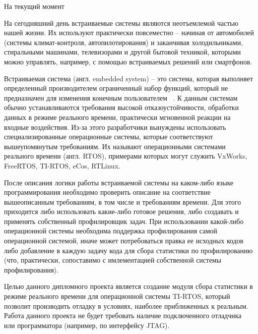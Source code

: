\label{sec:intro}

На текущий момент 

На сегодняшний день встраиваемые системы являются неотъемлемой частью нашей жизни.
Их используют практически повсеместно -- начиная от автомобилей
(системы климат-контроля, автопилотирования)
и заканчивая холодильниками, стиральными машинами, телевизорами
и другой бытовой техникой, которыми можно управлять, например,
с помощью встраиваемых решений или смартфонов.

Встраиваемая система (англ. embedded system) -- это система, которая выполняет
определенный производителем ограниченный набор функций,
который не предназначен для изменения конечным пользователем ~\cite{esd_book}.
К данным системам обычно устанавливаются требования высокой отказоустойчивости,
обработки данных в режиме реального времени, практически мгновенной реакции
на входные воздействия. Из-за этого разработчики
вынуждены использовать специализированные операционные системы,
которые соответствуют вышеупомянутым требованиям. Их
называют операционными системами реального времени
(англ. RTOS), примерами которых могут служить
VxWorks, FreeRTOS, TI-RTOS, eCos, RTLinux.


После описания логики работы встраиваемой системы на каком-либо
языке программирования необходимо проверить описание на соответствие
вышеописанным требованиям, в том числе и требованиям времени.
Для этого приходится либо использовать какие-либо готовое решения,
либо создавать и применять собственный профилировщик задач.
При использовании какой-либо операционной
системы необходима поддержка профилирования самой операционной системой,
иначе может потребоваться правка ее исходных кодов либо добавление
в каждую задачу кода для сбора статистики по профилированию (что, практически, сопоставимо с
имлементацией собственной системы профилирования).


Целью данного дипломного проекта является создание модуля сбора статистики
в режиме реального времени для операционной системы TI-RTOS, который позволит
производить отладку в условиях, наиболее приближенных к реальным.
Работа данного проекта не будет требовать наличие подключенного отладчика
или программатора (например, по интерфейсу JTAG).

